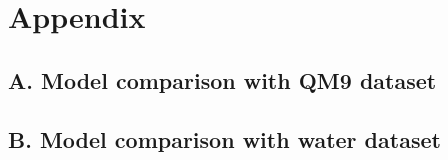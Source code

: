 {}
\chapter*{Appendix}
\appendix
\section*{A. Model comparison with QM9 dataset}
\label{appendix:qm9modelcomparison}


\newpage

\section*{B. Model comparison with water dataset}
\label{appendix:watermodelcomparison }

